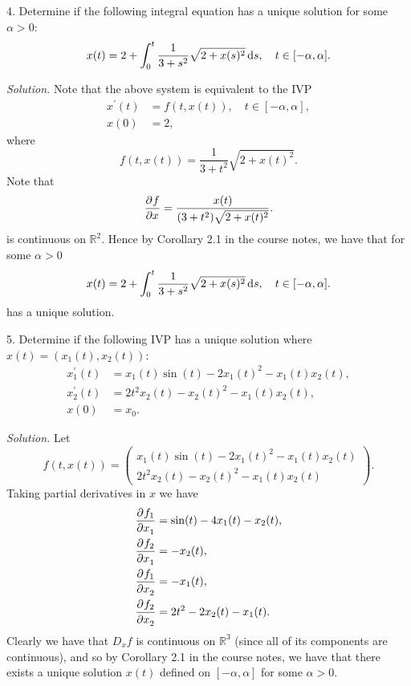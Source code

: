 \documentclass{article}
\newcommand{\R}{\mathbb{R}}
\begin{document}
\newpage

4. Determine if the following integral equation has a unique solution for some $\alpha > 0$:
%
\begin{equation*}
    x(t) = 2 + \int_0^t \frac{1}{3 + s^2} \sqrt{2 + x(s)^2} \dif s, \quad t \in [-\alpha, \alpha]
    .
\end{equation*}

\textit{Solution.}
Note that the above system is equivalent to the IVP
%
\begin{align*}
    x^\prime(t) &= f(t, x(t)), \quad t \in [-\alpha, \alpha], \\
    x(0) &= 2,
\end{align*}
%
where
%
\begin{equation*}
    f(t, x(t)) = \frac{1}{3 + t^2} \sqrt{2 + x(t)^2}.
\end{equation*}
%
Note that
%
\begin{align*}
    \dpd{f}{x} = \frac{x(t)}{(3 + t^2) \sqrt{2 + x(t)^2}}.
\end{align*}
%
is continuous on $\R^2$. Hence by Corollary 2.1 in the course notes,
we have that for some $\alpha > 0$
%
\begin{equation*}
    x(t) = 2 + \int_0^t \frac{1}{3 + s^2} \sqrt{2 + x(s)^2} \dif s, \quad t \in [-\alpha, \alpha]
    .
\end{equation*}
%
has a unique solution.

\newpage

5. Determine if the following IVP has a unique solution where $x(t) = (x_1(t), x_2(t))$:
%
\begin{align*}
    x_1^\prime(t) &= x_1(t) \sin(t) - 2 x_1(t)^2 - x_1(t) x_2(t), \\
    x_2^\prime(t) &= 2 t^2 x_2(t) - x_2(t)^2 - x_1(t) x_2(t), \\
    x(0) &= x_0.
\end{align*}

\textit{Solution.}
Let
%
\begin{equation*}
    f(t, x(t)) =
    \begin{pmatrix}
        x_1(t) \sin(t) - 2 x_1(t)^2 - x_1(t) x_2(t) \\
        2 t^2 x_2(t) - x_2(t)^2 - x_1(t) x_2(t)
    \end{pmatrix}
    .
\end{equation*}
%
Taking partial derivatives in $x$ we have
%
\begin{align*}
    \dpd{f_1}{x_1} &= \sin(t) - 4 x_1(t) - x_2(t), \\
    \dpd{f_2}{x_1} &= - x_2(t), \\
    \dpd{f_1}{x_2} &= - x_1(t), \\
    \dpd{f_2}{x_2} &= 2t^2 - 2 x_2(t) - x_1(t)
    .
\end{align*}
%
Clearly we have that $D_x f$ is continuous on $\R^3$ (since all
of its components are continuous), and
so by Corollary 2.1 in the course notes, we have that there exists
a unique solution $x(t)$ defined on $[-\alpha, \alpha]$ for some
$\alpha > 0$.
\end{document}
